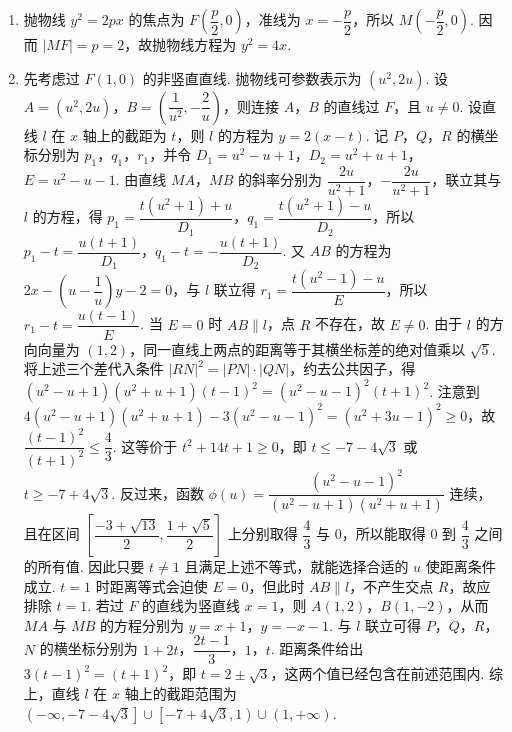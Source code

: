 \begin{solution}
\begin{enumerate}
\item 抛物线 \(y^{2}=2px\) 的焦点为 \(F\left(\dfrac p2,0\right)\)，准线为 \(x=-\dfrac p2\)，所以 \(M\left(-\dfrac p2,0\right)\). 因而 \(|MF|=p=2\)，故抛物线方程为 \(y^{2}=4x\).

\item 先考虑过 \(F(1,0)\) 的非竖直直线. 抛物线可参数表示为 \((u^{2},2u)\). 设
\(A=(u^{2},2u)\)，\(B=\left(\dfrac1{u^{2}},-\dfrac2u\right)\)，则连接 \(A\)，\(B\) 的直线过 \(F\)，且 \(u\ne0\). 设直线 \(l\) 在 \(x\) 轴上的截距为 \(t\)，则 \(l\) 的方程为 \(y=2(x-t)\).
记 \(P\)，\(Q\)，\(R\) 的横坐标分别为 \(p_1\)，\(q_1\)，\(r_1\)，并令
\(D_1=u^{2}-u+1\)，\(D_2=u^{2}+u+1\)，\(E=u^{2}-u-1\). 由直线 \(MA\)，\(MB\) 的斜率分别为 \(\dfrac{2u}{u^{2}+1}\)，\(-\dfrac{2u}{u^{2}+1}\)，联立其与 \(l\) 的方程，得
\(p_1=\dfrac{t(u^{2}+1)+u}{D_1}\)，\(q_1=\dfrac{t(u^{2}+1)-u}{D_2}\)，所以
\(p_1-t=\dfrac{u(t+1)}{D_1}\)，\(q_1-t=-\dfrac{u(t+1)}{D_2}\).
又 \(AB\) 的方程为 \(2x-\left(u-\dfrac1u\right)y-2=0\)，与 \(l\) 联立得
\(r_1=\dfrac{t(u^{2}-1)-u}{E}\)，所以 \(r_1-t=\dfrac{u(t-1)}{E}\). 当 \(E=0\) 时 \(AB\parallel l\)，点 \(R\) 不存在，故 \(E\ne0\).
由于 \(l\) 的方向向量为 \((1,2)\)，同一直线上两点的距离等于其横坐标差的绝对值乘以 \(\sqrt5\). 将上述三个差代入条件 \(|RN|^{2}=|PN|\cdot|QN|\)，约去公共因子，得
\((u^{2}-u+1)(u^{2}+u+1)(t-1)^{2}=(u^{2}-u-1)^{2}(t+1)^{2}\).
注意到
\(4(u^{2}-u+1)(u^{2}+u+1)-3(u^{2}-u-1)^{2}=(u^{2}+3u-1)^{2}\geq0\)，故
\(\dfrac{(t-1)^{2}}{(t+1)^{2}}\leq\dfrac43\). 这等价于 \(t^{2}+14t+1\geq0\)，即
\(t\leq-7-4\sqrt3\) 或 \(t\geq-7+4\sqrt3\).
反过来，函数
\(\phi(u)=\dfrac{(u^{2}-u-1)^{2}}{(u^{2}-u+1)(u^{2}+u+1)}\) 连续，且在区间 \(\left[\dfrac{-3+\sqrt{13}}2,\dfrac{1+\sqrt5}2\right]\) 上分别取得 \(\dfrac43\) 与 \(0\)，所以能取得 \(0\) 到 \(\dfrac43\) 之间的所有值. 因此只要 \(t\ne1\) 且满足上述不等式，就能选择合适的 \(u\) 使距离条件成立. \(t=1\) 时距离等式会迫使 \(E=0\)，但此时 \(AB\parallel l\)，不产生交点 \(R\)，故应排除 \(t=1\).
若过 \(F\) 的直线为竖直线 \(x=1\)，则 \(A(1,2)\)，\(B(1,-2)\)，从而 \(MA\) 与 \(MB\) 的方程分别为 \(y=x+1\)，\(y=-x-1\). 与 \(l\) 联立可得 \(P\)，\(Q\)，\(R\)，\(N\) 的横坐标分别为 \(1+2t\)，\(\dfrac{2t-1}{3}\)，\(1\)，\(t\). 距离条件给出 \(3(t-1)^{2}=(t+1)^{2}\)，即 \(t=2\pm\sqrt3\)，这两个值已经包含在前述范围内.
综上，直线 \(l\) 在 \(x\) 轴上的截距范围为
\(\left(-\infty,-7-4\sqrt3\right]\cup\left[-7+4\sqrt3,1\right)\cup(1,+\infty)\).
\end{enumerate}
\end{solution}

